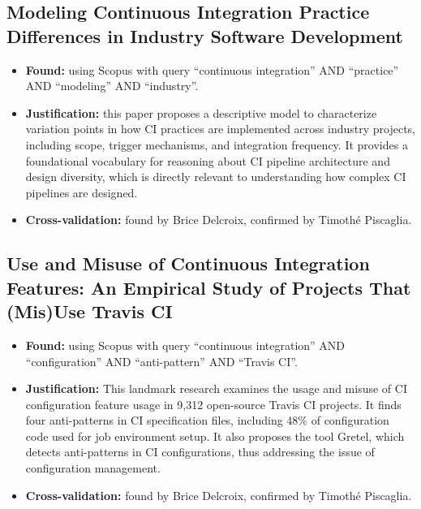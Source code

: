 \documentclass[a4paper,11pt,oneside]{article}
\begin{document}
\subsection{Modeling Continuous Integration Practice Differences in Industry Software Development \cite{Stahl2014}}
%
\begin{itemize}
    \item \textbf{Found:} using Scopus with query ``continuous integration'' AND ``practice'' AND ``modeling'' AND ``industry''.
    \item \textbf{Justification:} this paper proposes a descriptive model to characterize variation points in how CI practices are implemented across industry projects, including scope, trigger mechanisms, and integration frequency. It provides a foundational vocabulary for reasoning about CI pipeline architecture and design diversity, which is directly relevant to understanding how complex CI pipelines are designed.
    \item \textbf{Cross-validation:} found by Brice Delcroix, confirmed by Timoth\'{e} Piscaglia.
\end{itemize}

\subsection{Use and Misuse of Continuous Integration Features: An Empirical Study of Projects That (Mis)Use Travis CI \cite{Gallaba2020}}
%
\begin{itemize}
    \item \textbf{Found:} using Scopus with query ``continuous integration'' AND ``configuration'' AND ``anti-pattern'' AND ``Travis CI''.
    \item \textbf{Justification:} This landmark research examines the usage and misuse of CI configuration feature usage in 9,312 open-source Travis CI projects. It finds four anti-patterns in CI specification files, including 48\% of configuration code used for job environment setup. It also proposes the tool Gretel, which detects anti-patterns in CI configurations, thus addressing the issue of configuration management.
    \item \textbf{Cross-validation:} found by Brice Delcroix, confirmed by Timoth\'{e} Piscaglia.
\end{itemize}

\end{document}
